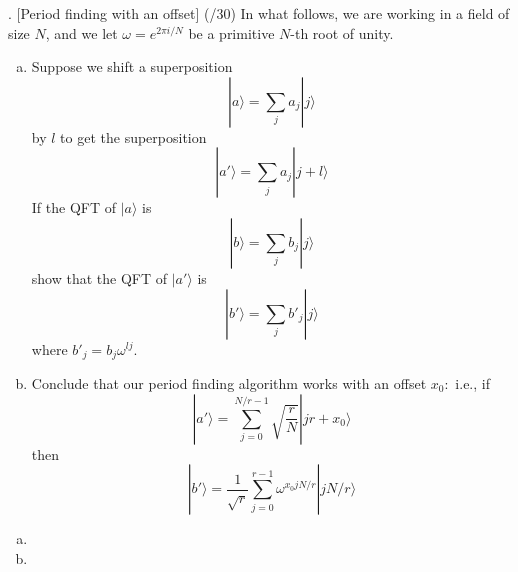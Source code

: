 \documentclass[11pt]{article}
\newenvironment{solution}{\begin{mdframed}[skipabove=\baselineskip,innertopmargin=\baselineskip,innerbottommargin=\baselineskip]
  }{\end{mdframed}}
\begin{document}
\newpage

. [Period finding with an offset] (/30)
\noindent In what follows, we are working in a field of size $N$, and we let $\omega = e^{2\pi i/N}$ be a primitive $N$-th root of unity.
\begin{enumerate}[(a)]
    \item Suppose we shift a superposition 
    $$|a \rangle= \sum_j a_j |j  \rangle$$
    by $l$ to get the superposition 
    $$|a'\rangle= \sum_j a_j |j+l\rangle$$
    If the QFT of $|a\rangle$ is 
    $$|b \rangle= \sum_j b_j |j  \rangle$$
    show that the QFT of $|a'\rangle$ is 
    $$|b'\rangle= \sum_j b'_j |j  \rangle$$
    where $b'_j=b_j\omega^{lj}$.
    \item Conclude that our period finding algorithm works with an offset $x_0:$ i.e., if 
    $$|a'\rangle=\sum_{j=0}^{N/r-1}\sqrt{\frac{r}{N}}|jr+x_0\rangle$$ 
    then
    $$|b'\rangle=\frac{1}{\sqrt{r}}\sum_{j=0}^{r-1}\omega^{x_0jN/r}|jN/r\rangle$$ 
\end{enumerate}

\begin{solution}
\begin{enumerate}[(a)]
    \item
    \item
\end{enumerate}
\end{solution}

\end{document}
